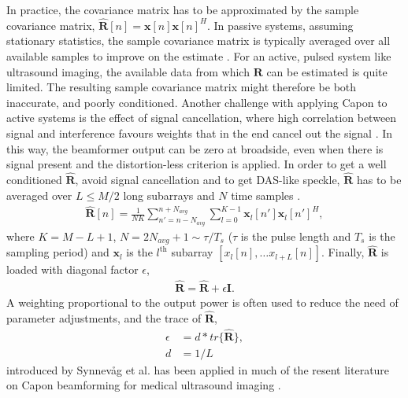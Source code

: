 \documentclass[journal]{IEEEtran}
\newcommand{\mat}[1]{\mathbf{#1}}
\renewcommand{\vec}[1]{\mathbf{#1}}
\begin{document}
In practice, the covariance matrix has to be approximated by the sample covariance matrix, $\mat{\hat{R}}[n] = \vec{x}[n]\vec{x}[n]^H$. In passive systems, assuming stationary statistics, the sample covariance matrix is typically averaged over all available samples to improve on the estimate \cite{Krima}. For an active, pulsed system like ultrasound imaging, the available data from which $\mat{R}$ can be estimated is quite limited. The resulting sample covariance matrix might therefore be both inaccurate, and poorly conditioned. Another challenge with applying Capon to active systems is the effect of signal cancellation, where high correlation between signal and interference favours weights that in the end cancel out the signal \cite{Synnevag2009a}. In this way, the beamformer output can be zero at broadside, even when there is signal present and the distortion-less criterion is applied. 
In order to get a well conditioned $\mat{\hat{R}}$, avoid signal cancellation and to get DAS-like speckle, $\mat{\hat{R}}$ has to be averaged over $L\le M/2$ long subarrays and $N$ time samples \cite{Synnevag2007, Synnevag2007a}.
\begin{align}
\mat{\hat{R}}[n] = \frac{1}{NK}\sum_{n'=n-N_{avg}}^{n+N_{avg}} \sum_{l=0}^{K-1} \vec{x}_l[n']\vec{x}_l[n']^H,\label{eq:R}
\end{align}
where $K = M-L+1$, $N = 2N_{avg} + 1\sim \tau/T_s$ ($\tau$ is the pulse length and $T_s$ is the sampling period) and $\vec{x}_l$ is the $l^\text{th}$ subarray $[x_l[n], \dotso x_{l+L}[n]]$.
Finally, $\mat{\hat{R}}$ is loaded with diagonal factor $\epsilon$, 
\begin{align}
\mat{\hat{R}} = \mat{\hat{R}} + \epsilon\mat{I}.
\end{align}
A weighting proportional to the output power is often used to reduce the need of parameter adjustments, and the trace of $\mat{\hat{R}}$, 
\begin{align}
\epsilon &= d*tr\{\mat{\hat{R}}\}, \\
d &= 1/L
\end{align}
introduced by Synnev\aa{}g et al. \cite{Synnevag2007} has been applied in much of the resent literature on Capon beamforming for medical ultrasound imaging \cite{Nilsen2009, Wang2009, Mehdizadeh2012}. 

\end{document}
